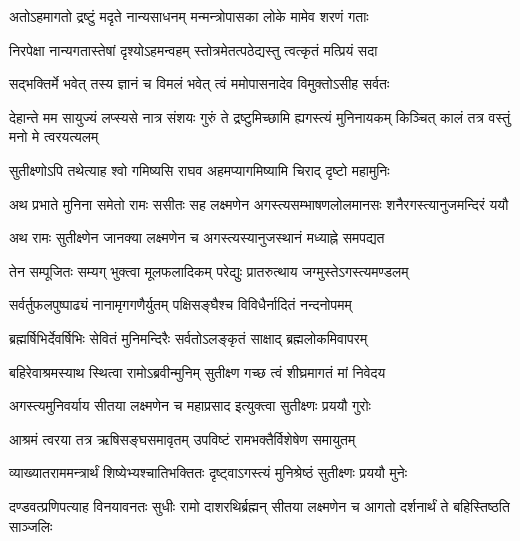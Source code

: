 \twolineshloka
{अतोऽहमागतो द्रष्टुं मदृते नान्यसाधनम्}
{मन्मन्त्रोपासका लोके मामेव शरणं गताः} %

\twolineshloka
{निरपेक्षा नान्यगतास्तेषां दृश्योऽहमन्वहम्}
{स्तोत्रमेतत्पठेद्यस्तु त्वत्कृतं मत्प्रियं सदा} %

\twolineshloka
{सद्भक्तिर्मे भवेत् तस्य ज्ञानं च विमलं भवेत्}
{त्वं ममोपासनादेव विमुक्तोऽसीह सर्वतः} %

\threelineshloka
{देहान्ते मम सायुज्यं लप्स्यसे नात्र संशयः}
{गुरुं ते द्रष्टुमिच्छामि ह्यगस्त्यं मुनिनायकम्}
{किञ्चित् कालं तत्र वस्तुं मनो मे त्वरयत्यलम्} %

\twolineshloka
{सुतीक्ष्णोऽपि तथेत्याह श्वो गमिष्यसि राघव}
{अहमप्यागमिष्यामि चिराद् दृष्टो महामुनिः} %

\fourlineindentedshloka
{अथ प्रभाते मुनिना समेतो}
{रामः ससीतः सह लक्ष्मणेन}
{अगस्त्यसम्भाषणलोलमानसः}
{शनैरगस्त्यानुजमन्दिरं ययौ} %





\twolineshloka
{अथ रामः सुतीक्ष्णेन जानक्या लक्ष्मणेन च}
{अगस्त्यस्यानुजस्थानं मध्याह्ने समपद्यत} %

\twolineshloka
{तेन सम्पूजितः सम्यग् भुक्त्वा मूलफलादिकम्}
{परेद्युः प्रातरुत्थाय जग्मुस्तेऽगस्त्यमण्डलम्} %

\twolineshloka
{सर्वर्तुफलपुष्पाढ्यं नानामृगगणैर्युतम्}
{पक्षिसङ्घैश्च विविधैर्नादितं नन्दनोपमम्} %

\twolineshloka
{ब्रह्मर्षिभिर्देवर्षिभिः सेवितं मुनिमन्दिरैः}
{सर्वतोऽलङ्कृतं साक्षाद् ब्रह्मलोकमिवापरम्} %

\twolineshloka
{बहिरेवाश्रमस्याथ स्थित्वा रामोऽब्रवीन्मुनिम्}
{सुतीक्ष्ण गच्छ त्वं शीघ्रमागतं मां निवेदय} %

\twolineshloka
{अगस्त्यमुनिवर्याय सीतया लक्ष्मणेन च}
{महाप्रसाद इत्युक्त्वा सुतीक्ष्णः प्रययौ गुरोः} %

\twolineshloka
{आश्रमं त्वरया तत्र ऋषिसङ्घसमावृतम्}
{उपविष्टं रामभक्तैर्विशेषेण समायुतम्} %

\twolineshloka
{व्याख्यातराममन्त्रार्थं शिष्येभ्यश्चातिभक्तितः}
{दृष्ट्वाऽगस्त्यं मुनिश्रेष्ठं सुतीक्ष्णः प्रययौ मुनेः} %

\threelineshloka
{दण्डवत्प्रणिपत्याह विनयावनतः सुधीः}
{रामो दाशरथिर्ब्रह्मन् सीतया लक्ष्मणेन च}
{आगतो दर्शनार्थं ते बहिस्तिष्ठति साञ्जलिः} %


